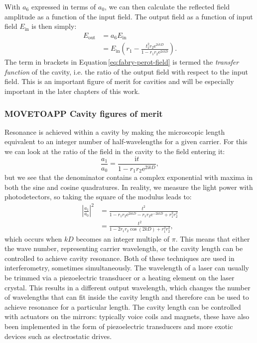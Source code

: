 With $a_6$ expressed in terms of $a_0$, we can then calculate the reflected field amplitude as a function of the input field. The output field as a function of input field $E_{\text{in}}$ is then simply:
\begin{equation}
  \label{eq:fabry-perot-field}
  \begin{split}
    E_{\text{out}} &= a_6 E_{\text{in}} \\
                   &= E_{\text{in}} \left( r_1 - \frac{t_1^2 r_2 \text{e}^{2ikD}}{1 - r_1 r_2 \text{e}^{2ikD}} \right).
  \end{split}
\end{equation}
The term in brackets in Equation\,\ref{eq:fabry-perot-field} is termed the \emph{transfer function} of the cavity, i.e. the ratio of the output field with respect to the input field. This is an important figure of merit for cavities and will be especially important in the later chapters of this work.

\subsubsection{MOVETOAPP Cavity figures of merit}
Resonance is achieved within a \FP{} cavity by making the microscopic length equivalent to an integer number of half-wavelengths for a given carrier. For this we can look at the ratio of the field in the cavity to the field entering it:
\begin{equation}
  \frac{a_1}{a_0} = \frac{\text{i} t}{1 - r_1 r_2 \text{e}^{2\text{i}kD}},
\end{equation}
but we see that the denominator contains a complex exponential with maxima in both the sine and cosine quadratures. In reality, we measure the light power with photodetectors, so taking the square of the modulus leads to:
\begin{equation}
  \begin{split}
    \left|\frac{a_1}{a_0}\right|^2 &= \frac{t^2}{1-r_1 r_2 \text{e}^{2\text{i}kD} - r_1 r_2 \text{e}^{-2\text{i}kD} + r_1^2 r_2^2} \\
                                   &= \frac{t^2}{1 - 2 r_1 r_2 \cos{\left( 2kD \right)} + r_1^2 r_2^2},
  \end{split}
\end{equation}
which occurs when $kD$ becomes an integer multiple of $\pi$. This means that either the wave number, representing carrier wavelength, or the cavity length can be controlled to achieve cavity resonance. Both of these techniques are used in interferometry, sometimes simultaneously. The wavelength of a laser can usually be trimmed via a piezoelectric transducer or a heating element on the laser crystal. This results in a different output wavelength, which changes the number of wavelengths that can fit inside the cavity length and therefore can be used to achieve resonance for a particular length. The cavity length can be controlled with actuators on the mirrors: typically voice coils and magnets, these have also been implemented in the form of piezoelectric transducers and more exotic devices such as electrostatic drives.

